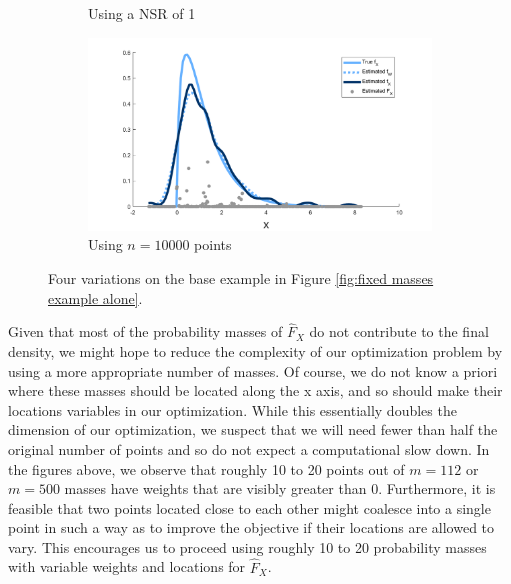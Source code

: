 \begin{figure}
\begin{subfigure}[b]{0.49\textwidth}
		\caption{Using a NSR of 1}
		\label{fig:fixed masses example NSR1}
	\end{subfigure}
	\hfill
	\begin{subfigure}[b]{0.49\textwidth}
		\centering
		\includegraphics[width = \textwidth]{Figures/Deconvolution/fixed_masses_example_n10000_updated.png}
		\caption{Using $n = 10000$ points}
		\label{fig:fixed masses example n10000}
	\end{subfigure}
	\caption{Four variations on the base example in Figure \ref{fig:fixed masses example alone}.}
	\label{fig:comparison different fixed masses examples}
\end{figure}

Given that most of the probability masses of $\hat{F}_X$ do not contribute to the final density, we might hope to reduce the complexity of our optimization problem by using a more appropriate number of masses. Of course, we do not know a priori where these masses should be located along the x axis, and so should make their locations variables in our optimization. While this essentially doubles the dimension of our optimization, we suspect that we will need fewer than half the original number of points and so do not expect a computational slow down. In the figures above, we observe that roughly 10 to 20 points out of $m = 112$ or $m = 500$ masses have weights that are visibly greater than 0. Furthermore, it is feasible that two points located close to each other might coalesce into a single point in such a way as to improve the objective if their locations are allowed to vary. This encourages us to proceed using roughly 10 to 20 probability masses with variable weights and locations for $\hat{F}_X$.

